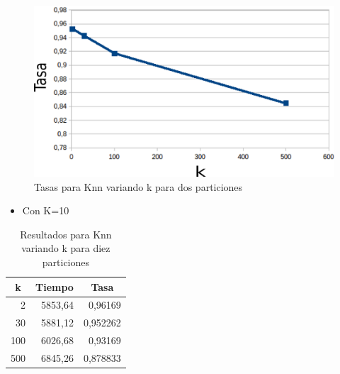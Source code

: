     \begin{figure}[H]
    \centering
    \includegraphics[scale=0.3]{Graficos/knnTasa2.png}
    \caption{Tasas para Knn variando k para dos particiones}
	\label{knnTasa2}
    \end{figure}
\bigskip
\bigskip
\bigskip






\begin{itemize}
\item Con K=10\\
\end{itemize}

\begin{center}

\begin{table}[H]
\centering
\begin{tabular}{|r|r|r|}
\hline
\multicolumn{1}{|c|}{k} & \multicolumn{1}{c|}{Tiempo} & \multicolumn{1}{c|}{Tasa} \\ \hline
2 & 5853,64 & 0,96169 \\ \hline
30 & 5881,12 & 0,952262 \\ \hline
100 & 6026,68 & 0,93169 \\ \hline
500 & 6845,26 & 0,878833 \\ \hline
\end{tabular}
\caption{Resultados para Knn variando k para diez particiones}
\label{}
\end{table}
\end{center}

\bigskip
\bigskip
\bigskip

